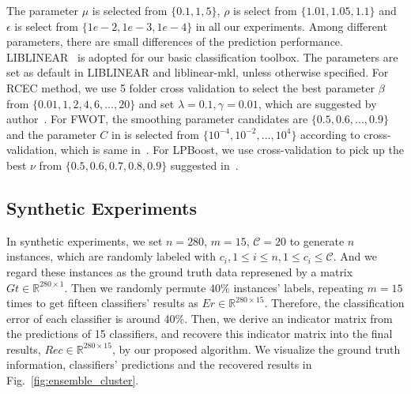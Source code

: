 \documentclass[10pt,twocolumn,letterpaper]{article}
\def\calC{{\mathcal{C}}}
\def\bL{{\bf L}}
\def\dsR{\mathds{R}}
\begin{document}
The parameter $\mu$ is selected from $\{0.1, 1, 5\}$,
$\rho$ is select from $\{1.01, 1.05, 1.1\}$
and $\epsilon$ is select from $\{1e-2, 1e-3, 1e-4\}$ in all our experiments.
Among different parameters, there are small differences of the prediction performance.
LIBLINEAR~\cite{fan2008liblinear} is adopted for our basic classification toolbox.
The parameters are set as default in LIBLINEAR and liblinear-mkl, unless otherwise specified.
For RCEC method, we use 5 folder cross validation to select the best parameter $\beta$ from $\{0.01,1,2,4,6,...,20\}$ and set $\lambda = 0.1, \gamma = 0.01$, which are suggested by author~\cite{yiicdm2012robust}.
For FWOT, the smoothing parameter candidates are $\{0.5, 0.6, ... , 0.9\}$ and the parameter $C$ in is selected from $\{10^{-4},10^{-2},...,10^{4}\}$ according to cross-validation, which is same in~\cite{xuiccv2013feature}.
For LPBoost, we use cross-validation to pick up the best $\nu$ from $\{0.5,0.6,0.7,0.8,0.9\}$ suggested in~\cite{xuiccv2013feature}.


\subsection{Synthetic Experiments}

In synthetic experiments, we set $n = 280$, $m = 15$, $\calC = 20$ to generate $n$ instances, which are randomly labeled with $c_i, 1 \leq i \leq n, 1 \leq c_i \leq \calC$.
And we regard these instances as the ground truth data represened by a matrix $Gt \in \dsR^{280 \times 1}$.
Then we randomly permute $40\%$ instances' labels,
repeating $m = 15$ times to get fifteen classifiers' results as $Er \in \dsR^{280 \times 15}$.
Therefore, the classification error of each classifier is around 40\%.
Then, we derive an indicator matrix from the predictions of 15 classifiers,
and recovere this indicator matrix into the final results, $Rec \in \dsR^{280 \times 15}$, by our proposed algorithm.
We visualize the ground truth information, classifiers' predictions and the recovered results in Fig.~\ref{fig:ensemble_cluster}.
\end{document}
